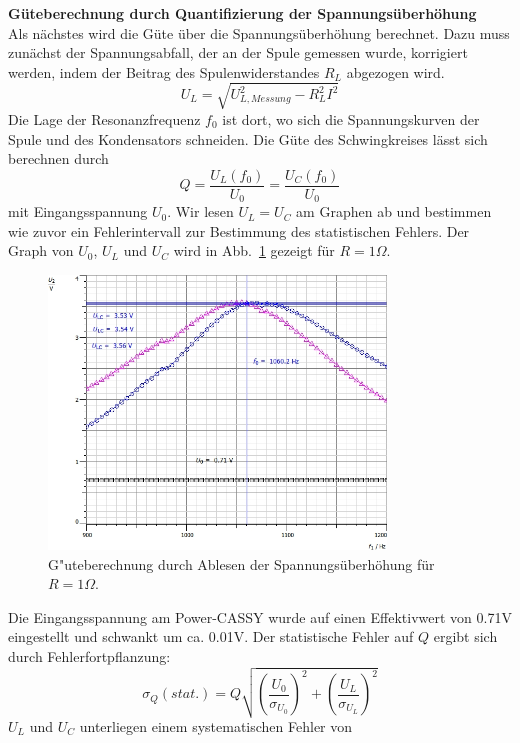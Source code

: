 \documentclass[12pt,a4paper]{article}
\begin{document}
\textbf{Güteberechnung durch Quantifizierung der Spannungsüberhöhung}\\
Als nächstes wird die Güte über die Spannungsüberhöhung berechnet. Dazu muss zunächst der Spannungsabfall, der an der Spule gemessen wurde, korrigiert werden, indem der Beitrag des Spulenwiderstandes $R_L$ abgezogen wird.
\begin{equation}
U_L=\sqrt{U_{L, Messung}^2-R_L^2I^2}
\end{equation}
Die Lage der Resonanzfrequenz $f_0$ ist dort, wo sich die Spannungskurven der Spule und des Kondensators schneiden. Die Güte des Schwingkreises lässt sich berechnen durch
\begin{equation}
Q=\frac{U_L(f_0)}{U_0}=\frac{U_C(f_0)}{U_0}
\end{equation}
mit Eingangsspannung $U_0$. Wir lesen $U_L=U_C$ am Graphen ab und bestimmen wie zuvor ein Fehlerintervall zur Bestimmung des statistischen Fehlers. Der Graph von $U_0$, $U_L$ und $U_C$ wird in Abb.~\ref{S1Ohm_U} gezeigt für $R=1\Omega$.
\begin{figure}[H]
	\centering
	\includegraphics[width=0.8\textwidth]{Daten/S1_U.jpg}
	\caption{G"uteberechnung durch Ablesen der Spannungsüberhöhung für $R=1\Omega$.}
	\label{S1Ohm_U}
\end{figure}
Die Eingangsspannung am Power-CASSY wurde auf einen Effektivwert von 0.71V eingestellt und schwankt um ca. 0.01V. Der statistische Fehler auf $Q$ ergibt sich durch Fehlerfortpflanzung:
\begin{equation}
\sigma_Q(stat.)=Q\sqrt{\left(\frac{U_0}{\sigma_{U_0}}\right)^2+\left(\frac{U_L}{\sigma_{U_L}}\right)^2}
\end{equation}
$U_L$ und $U_C$ unterliegen einem systematischen Fehler von
\end{document}
